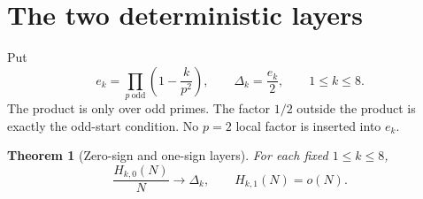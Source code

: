 \documentclass[11pt]{article}
\newtheorem{theorem}{Theorem}[section]
\theoremstyle{definition}
\theoremstyle{remark}
\begin{document}
\section{The two deterministic layers}

Put
\begin{equation}
 e_k=\prod_{p\ \mathrm{odd}}\left(1-\frac{k}{p^2}\right),
 \qquad \Delta_k=\frac{e_k}{2},
 \qquad 1\le k\le8.
 \label{eq:delta}
\end{equation}
The product is only over odd primes.  The factor $1/2$ outside the product
is exactly the odd-start condition.  No $p=2$ local factor is inserted into
$e_k$.

\begin{theorem}[Zero-sign and one-sign layers]
For each fixed $1\le k\le8$,
\begin{equation}
 \frac{H_{k,0}(N)}{N}\longrightarrow\Delta_k,
 \qquad H_{k,1}(N)=o(N).
 \label{eq:H01}
\end{equation}
\end{theorem}
\end{document}
